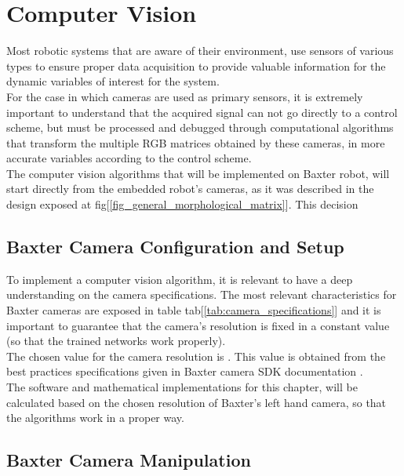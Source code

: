 \documentclass[11pt]{report} %
\begin{document}
\chapter{Computer Vision}

Most robotic systems that are aware of their environment, use sensors of various types to ensure proper data acquisition to provide valuable information for the dynamic variables of interest for the system.\\

For the case in which cameras are used as primary sensors, it is extremely important to understand that the acquired signal can not go directly to a control scheme, but must be processed and debugged through computational algorithms that transform the multiple RGB matrices obtained by these cameras, in more accurate variables according to the control scheme.\\

The computer vision algorithms that will be implemented on Baxter robot, will start directly from the embedded robot's cameras, as it was described in the design exposed at fig[\ref{fig_general_morphological_matrix}]. This decision

\section{Baxter Camera Configuration and Setup}

To implement a computer vision algorithm, it is relevant to have a deep understanding on the camera specifications. The most relevant characteristics for Baxter cameras are exposed in table tab[\ref{tab:camera_specifications}] and it is important to guarantee that the camera's resolution is fixed in a constant value (so that the trained networks work properly).\\

The chosen value for the camera resolution is . This value is obtained from the best practices specifications given in Baxter camera SDK documentation \citep{cite_baxter_hardware_specifications}.\\

The software and mathematical implementations for this chapter, will be calculated based on the chosen resolution of Baxter's left hand camera, so that the algorithms work in a proper way.\\

\section{Baxter Camera Manipulation}
\end{document}
